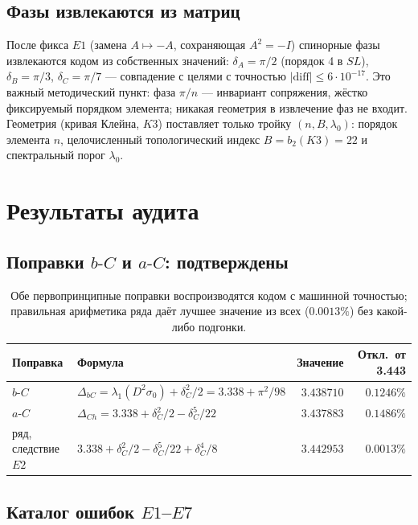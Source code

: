 \documentclass[11pt,a4paper]{article}
\theoremstyle{plain}
\theoremstyle{definition}
\theoremstyle{remark}
\begin{document}
\subsection{Фазы извлекаются из матриц}

После фикса $E1$ (замена $A\mapsto -A$, сохраняющая $A^2=-I$) спинорные фазы
извлекаются кодом из собственных значений:
$\delta_A=\pi/2$ (порядок 4 в $SL$), $\delta_B=\pi/3$, $\delta_C=\pi/7$ ---
совпадение с целями с точностью $|\mathrm{diff}|\le 6\cdot10^{-17}$. Это
важный методический пункт: фаза $\pi/n$ --- инвариант сопряжения, жёстко
фиксируемый порядком элемента; никакая геометрия в извлечение фаз не входит.
Геометрия (кривая Клейна, $K3$) поставляет только тройку $(n,B,\lambda_0)$:
порядок элемента $n$, целочисленный топологический индекс $B=b_2(K3)=22$ и
спектральный порог $\lambda_0$.

\section{Результаты аудита}\label{sec:audit}

\subsection{Поправки $b\text{-}C$ и $a\text{-}C$: подтверждены}

\begin{table}[htbp]
\centering\small
\begin{tabularx}{\textwidth}{l Y r r}
\toprule
Поправка & Формула & Значение & Откл.~от 3.443 \\
\midrule
$b\text{-}C$ & $\Delta_{bC}=\lambda_1(D^2\sigma_0)+\delta_C^2/2
   =3.338+\pi^2/98$ & $3.438710$ & $0.1246\%$ \\
$a\text{-}C$ & $\Delta_{Ch}=3.338+\delta_C^2/2-\delta_C^5/22$ &
   $3.437883$ & $0.1486\%$ \\
ряд, следствие $E2$ & $3.338+\delta_C^2/2-\delta_C^5/22+\delta_C^4/8$ &
   $3.442953$ & $\mathbf{0.0013\%}$ \\
\bottomrule
\end{tabularx}
\caption{Обе первопринципные поправки воспроизводятся кодом с машинной
точностью; правильная арифметика ряда даёт лучшее значение из всех
($0.0013\%$) без какой-либо подгонки.}
\label{tab:bcac}
\end{table}

\subsection{Каталог ошибок $E1$--$E7$}
\end{document}
